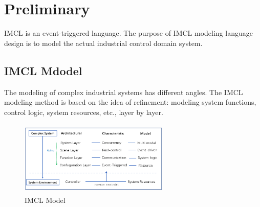 \section{Preliminary}
IMCL is an event-triggered language.
The purpose of IMCL modeling language design is to model the actual industrial control domain system.


\subsection{IMCL Mdodel}
The modeling of complex industrial systems has different angles.
The IMCL modeling method is based on the idea of refinement: modeling system functions, control logic, system resources, etc., layer by layer.


\begin{figure}[!htb]
  \centering
        \includegraphics[height=1.4in, width=2.8in]{IMCLLayer}
  \caption{IMCL Model}\label{IMCLLayer}
\end{figure}


